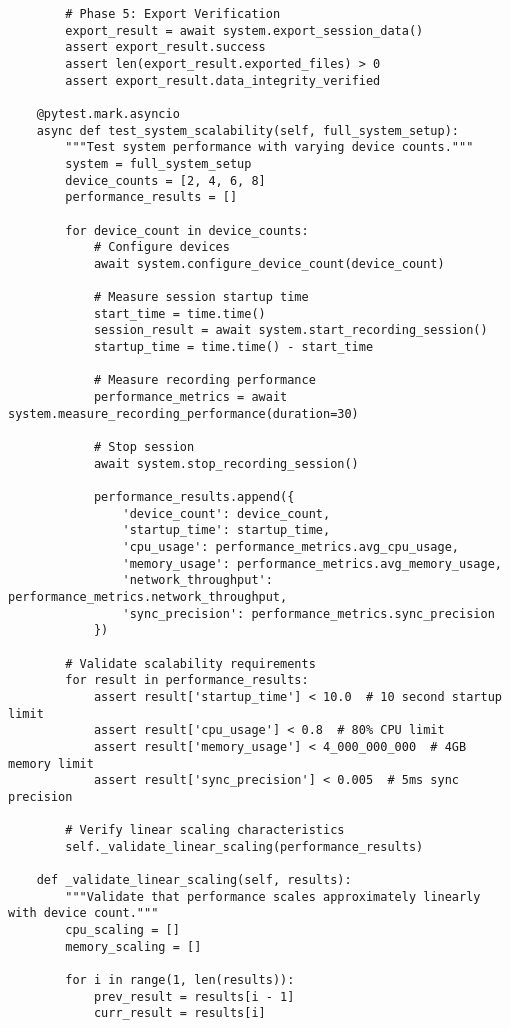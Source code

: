 \documentclass[12pt,a4paper]{report}
\begin{document}
\begin{verbatim}
        # Phase 5: Export Verification
        export_result = await system.export_session_data()
        assert export_result.success
        assert len(export_result.exported_files) > 0
        assert export_result.data_integrity_verified

    @pytest.mark.asyncio
    async def test_system_scalability(self, full_system_setup):
        """Test system performance with varying device counts."""
        system = full_system_setup
        device_counts = [2, 4, 6, 8]
        performance_results = []

        for device_count in device_counts:
            # Configure devices
            await system.configure_device_count(device_count)

            # Measure session startup time
            start_time = time.time()
            session_result = await system.start_recording_session()
            startup_time = time.time() - start_time

            # Measure recording performance
            performance_metrics = await system.measure_recording_performance(duration=30)

            # Stop session
            await system.stop_recording_session()

            performance_results.append({
                'device_count': device_count,
                'startup_time': startup_time,
                'cpu_usage': performance_metrics.avg_cpu_usage,
                'memory_usage': performance_metrics.avg_memory_usage,
                'network_throughput': performance_metrics.network_throughput,
                'sync_precision': performance_metrics.sync_precision
            })

        # Validate scalability requirements
        for result in performance_results:
            assert result['startup_time'] < 10.0  # 10 second startup limit
            assert result['cpu_usage'] < 0.8  # 80% CPU limit
            assert result['memory_usage'] < 4_000_000_000  # 4GB memory limit
            assert result['sync_precision'] < 0.005  # 5ms sync precision

        # Verify linear scaling characteristics
        self._validate_linear_scaling(performance_results)

    def _validate_linear_scaling(self, results):
        """Validate that performance scales approximately linearly with device count."""
        cpu_scaling = []
        memory_scaling = []

        for i in range(1, len(results)):
            prev_result = results[i - 1]
            curr_result = results[i]


\end{verbatim}
\end{document}
